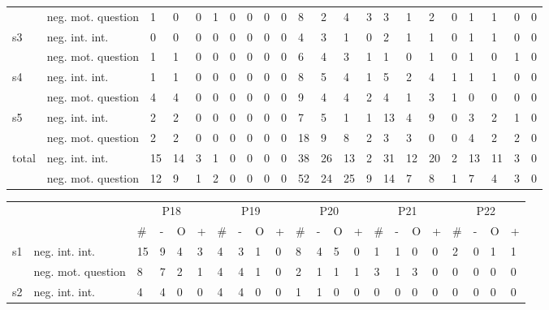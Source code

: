 \begin{screenonly}
\begin{table*}[h]
\begin{small}
\begin{tabular*}{\hsize}{@{\extracolsep{\fill}}llllllllllllllllllllll}
      & neg. mot. question & 1 & 0 & 0 & 1 & 0 & 0 & 0 & 0 & 8 & 2 & 4 & 3 & 3 & 1 & 2 & 0 & 1 & 1 & 0 & 0\\
      \multirow{2}{*}{s3} & neg. int. int. & 0 & 0 & 0 & 0 & 0 & 0 & 0 & 0 & 4 & 3 & 1 & 0 & 2 & 1 & 1 & 0 & 1 & 1 & 0 & 0\\
      & neg. mot. question & 1 & 1 & 0 & 0 & 0 & 0 & 0 & 0 & 6 & 4 & 3 & 1 & 1 & 0 & 1 & 0 & 1 & 0 & 1 & 0\\
      \multirow{2}{*}{s4} & neg. int. int. & 1 & 1 & 0 & 0 & 0 & 0 & 0 & 0 & 8 & 5 & 4 & 1 & 5 & 2 & 4 & 1 & 1 & 1 & 0 & 0\\
      & neg. mot. question & 4 & 4 & 0 & 0 & 0 & 0 & 0 & 0 & 9 & 4 & 4 & 2 & 4 & 1 & 3 & 1 & 0 & 0 & 0 & 0\\
      \multirow{2}{*}{s5} & neg. int. int. & 2 & 2 & 0 & 0 & 0 & 0 & 0 & 0 & 7 & 5 & 1 & 1 & 13 & 4 & 9 & 0 & 3 & 2 & 1 & 0\\
      & neg. mot. question & 2 & 2 & 0 & 0 & 0 & 0 & 0 & 0 & 18 & 9 & 8 & 2 & 3 & 3 & 0 & 0 & 4 & 2 & 2 & 0\\
      \multirow{2}{*}{total} & neg. int. int. & 15 & 14 & 3 & 1 & 0 & 0 & 0 & 0 & 38 & 26 & 13 & 2 & 31 & 12 & 20 & 2 & 13 & 11 & 3 & 0\\
      & neg. mot. question & 12 & 9 & 1 & 2 & 0 & 0 & 0 & 0 & 52 & 24 & 25 & 9 & 14 & 7 & 8 & 1 & 7 & 4 & 3 & 0\\
    \end{tabular*}
    \setlength{\tabcolsep}{1.1ex}
    \begin{tabular*}{\hsize}{@{\extracolsep{\fill}}llllllllllllllllllllll}
      \toprule
      &  & \multicolumn{4}{c}{P18} & \multicolumn{4}{c}{P19} & \multicolumn{4}{c}{P20} & \multicolumn{4}{c}{P21} & \multicolumn{4}{c}{P22}\\
      \cmidrule(lr){3-6}\cmidrule(lr){7-10}\cmidrule(lr){11-14}\cmidrule(lr){15-18}\cmidrule(lr){19-22}
      &  & \# & - & O & + & \# & - & O & + & \# & - & O & + & \# & - & O & + & \# & - & O & +\\
      \cmidrule(lr){3-6}\cmidrule(lr){7-10}\cmidrule(lr){11-14}\cmidrule(lr){15-18}\cmidrule(lr){19-22}
      \multirow{2}{*}{s1} & neg. int. int. & 15 & 9 & 4 & 3 & 4 & 3 & 1 & 0 & 8 & 4 & 5 & 0 & 1 & 1 & 0 & 0 & 2 & 0 & 1 & 1\\
      & neg. mot. question & 8 & 7 & 2 & 1 & 4 & 4 & 1 & 0 & 2 & 1 & 1 & 1 & 3 & 1 & 3 & 0 & 0 & 0 & 0 & 0\\
      \multirow{2}{*}{s2} & neg. int. int. & 4 & 4 & 0 & 0 & 4 & 4 & 0 & 0 & 1 & 1 & 0 & 0 & 0 & 0 & 0 & 0 & 0 & 0 & 0 & 0\\

\end{tabular*}
\end{small}
\end{table*}
\end{screenonly}
